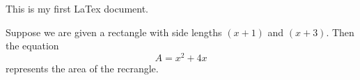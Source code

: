 \documentclass[11pt]{article}
\begin{document}
This is my first LaTex document.

Suppose we are given a rectangle with side lengths $(x+1)$ and $(x+3)$. Then the equation $$A=x^2+4x$$ represents the area of the recrangle.
\end{document}
